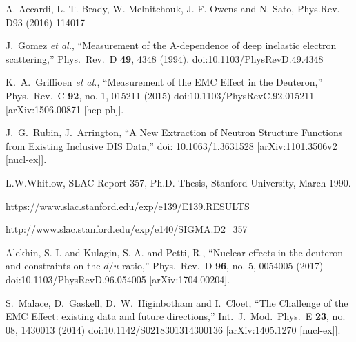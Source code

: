 \documentclass[oneside]{article}
\begin{document}
\begin{thebibliography}{99} 

 A. Accardi, L. T. Brady, W. Melnitchouk, J. F. Owens and N. Sato, Phys.Rev. D93 (2016) 114017

  J.~Gomez {\it et al.},
  ``Measurement of the A-dependence of deep inelastic electron scattering,''
  Phys.\ Rev.\ D {\bf 49}, 4348 (1994).
  doi:10.1103/PhysRevD.49.4348

  K.~A.~Griffioen {\it et al.},
  ``Measurement of the EMC Effect in the Deuteron,''
  Phys.\ Rev.\ C {\bf 92}, no. 1, 015211 (2015)
  doi:10.1103/PhysRevC.92.015211
  [arXiv:1506.00871 [hep-ph]].

  J.~G.~Rubin, J.~Arrington,
  ``A New Extraction of Neutron Structure Functions from Existing Inclusive DIS Data,''
  doi:	10.1063/1.3631528
  [arXiv:1101.3506v2 [nucl-ex]].
  
 L.W.Whitlow, SLAC-Report-357, Ph.D. Thesis, Stanford University, March 1990.

 https://www.slac.stanford.edu/exp/e139/E139.RESULTS

 http://www.slac.stanford.edu/exp/e140/SIGMA.D2\_357

 Alekhin, S. I. and Kulagin, S. A. and Petti, R.,
  ``Nuclear effects in the deuteron and constraints on the $d/u$ ratio,''
  Phys.\ Rev.\ D {\bf 96}, no. 5, 0054005 (2017)
  doi:10.1103/PhysRevD.96.054005
  [arXiv:1704.00204].

  S.~Malace, D.~Gaskell, D.~W.~Higinbotham and I.~Cloet,
  ``The Challenge of the EMC Effect: existing data and future directions,''
  Int.\ J.\ Mod.\ Phys.\ E {\bf 23}, no. 08, 1430013 (2014)
  doi:10.1142/S0218301314300136
  [arXiv:1405.1270 [nucl-ex]].
 
 
\end{thebibliography}

\end{document}
